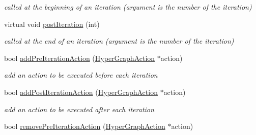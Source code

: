 \begin{DoxyCompactItemize}
\begin{DoxyCompactList}\small\item\em called at the beginning of an iteration (argument is the number of the iteration) \end{DoxyCompactList}\item 
\hypertarget{structg2o_1_1OptimizableGraph_ac8d41dc0830f1ae07e9cb4a8341d3ffb}{virtual void \hyperlink{structg2o_1_1OptimizableGraph_ac8d41dc0830f1ae07e9cb4a8341d3ffb}{post\-Iteration} (int)}\label{structg2o_1_1OptimizableGraph_ac8d41dc0830f1ae07e9cb4a8341d3ffb}

\begin{DoxyCompactList}\small\item\em called at the end of an iteration (argument is the number of the iteration) \end{DoxyCompactList}\item 
\hypertarget{structg2o_1_1OptimizableGraph_a2ab7899a0ff7bc29177e9447a10d508c}{bool \hyperlink{structg2o_1_1OptimizableGraph_a2ab7899a0ff7bc29177e9447a10d508c}{add\-Pre\-Iteration\-Action} (\hyperlink{classg2o_1_1HyperGraphAction}{Hyper\-Graph\-Action} $\ast$action)}\label{structg2o_1_1OptimizableGraph_a2ab7899a0ff7bc29177e9447a10d508c}

\begin{DoxyCompactList}\small\item\em add an action to be executed before each iteration \end{DoxyCompactList}\item 
\hypertarget{structg2o_1_1OptimizableGraph_a6db1ecbc582a7b79e1633eefc2109b26}{bool \hyperlink{structg2o_1_1OptimizableGraph_a6db1ecbc582a7b79e1633eefc2109b26}{add\-Post\-Iteration\-Action} (\hyperlink{classg2o_1_1HyperGraphAction}{Hyper\-Graph\-Action} $\ast$action)}\label{structg2o_1_1OptimizableGraph_a6db1ecbc582a7b79e1633eefc2109b26}

\begin{DoxyCompactList}\small\item\em add an action to be executed after each iteration \end{DoxyCompactList}\item 
\hypertarget{structg2o_1_1OptimizableGraph_a27f5ee7016b20bc6def24a2726fc824b}{bool \hyperlink{structg2o_1_1OptimizableGraph_a27f5ee7016b20bc6def24a2726fc824b}{remove\-Pre\-Iteration\-Action} (\hyperlink{classg2o_1_1HyperGraphAction}{Hyper\-Graph\-Action} $\ast$action)}\label{structg2o_1_1OptimizableGraph_a27f5ee7016b20bc6def24a2726fc824b}


\end{DoxyCompactItemize}
